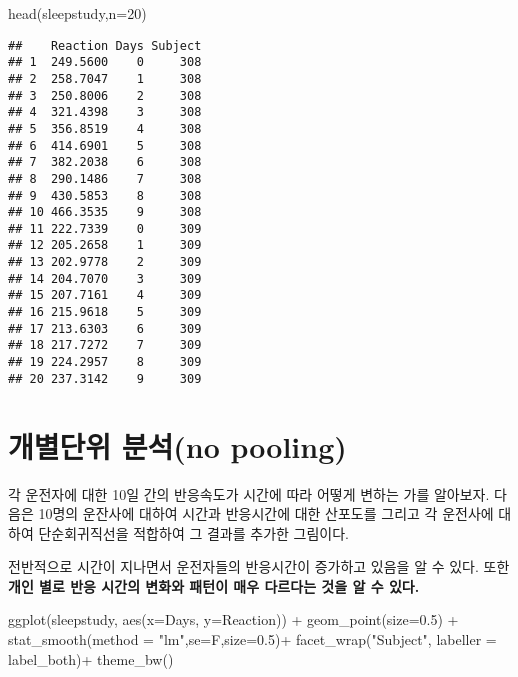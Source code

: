 \documentclass[
]{book}
\newenvironment{Shaded}{\begin{snugshade}}{\end{snugshade}}
\newcommand{\AttributeTok}[1]{\textcolor[rgb]{0.77,0.63,0.00}{#1}}
\newcommand{\DecValTok}[1]{\textcolor[rgb]{0.00,0.00,0.81}{#1}}
\newcommand{\FloatTok}[1]{\textcolor[rgb]{0.00,0.00,0.81}{#1}}
\newcommand{\FunctionTok}[1]{\textcolor[rgb]{0.00,0.00,0.00}{#1}}
\newcommand{\NormalTok}[1]{#1}
\newcommand{\SpecialCharTok}[1]{\textcolor[rgb]{0.00,0.00,0.00}{#1}}
\newcommand{\StringTok}[1]{\textcolor[rgb]{0.31,0.60,0.02}{#1}}
\begin{document}
\begin{Shaded}
\begin{Highlighting}[]
\FunctionTok{head}\NormalTok{(sleepstudy,}\AttributeTok{n=}\DecValTok{20}\NormalTok{)}
\end{Highlighting}
\end{Shaded}

\begin{verbatim}
##    Reaction Days Subject
## 1  249.5600    0     308
## 2  258.7047    1     308
## 3  250.8006    2     308
## 4  321.4398    3     308
## 5  356.8519    4     308
## 6  414.6901    5     308
## 7  382.2038    6     308
## 8  290.1486    7     308
## 9  430.5853    8     308
## 10 466.3535    9     308
## 11 222.7339    0     309
## 12 205.2658    1     309
## 13 202.9778    2     309
## 14 204.7070    3     309
## 15 207.7161    4     309
## 16 215.9618    5     309
## 17 213.6303    6     309
## 18 217.7272    7     309
## 19 224.2957    8     309
## 20 237.3142    9     309
\end{verbatim}

\hypertarget{uxac1cuxbcc4uxb2e8uxc704-uxbd84uxc11dno-pooling}{%
\section{개별단위 분석(no pooling)}\label{uxac1cuxbcc4uxb2e8uxc704-uxbd84uxc11dno-pooling}}

각 운전자에 대한 10일 간의 반응속도가 시간에 따라 어떻게 변하는 가를 알아보자. 다음은 10명의 운잔사에 대하여 시간과 반응시간에 대한 산포도를 그리고 각 운전사에 대하여 단순회귀직선을 적합하여 그 결과를 추가한 그림이다.

전반적으로 시간이 지나면서 운전자들의 반응시간이 증가하고 있음을 알 수 있다. 또한 \textbf{개인 별로 반응 시간의 변화와 패턴이 매우 다르다는 것을 알 수 있다.}

\begin{Shaded}
\begin{Highlighting}[]
\FunctionTok{ggplot}\NormalTok{(sleepstudy, }\FunctionTok{aes}\NormalTok{(}\AttributeTok{x=}\NormalTok{Days, }\AttributeTok{y=}\NormalTok{Reaction)) }\SpecialCharTok{+}
     \FunctionTok{geom\_point}\NormalTok{(}\AttributeTok{size=}\FloatTok{0.5}\NormalTok{) }\SpecialCharTok{+}
     \FunctionTok{stat\_smooth}\NormalTok{(}\AttributeTok{method =} \StringTok{"lm"}\NormalTok{,}\AttributeTok{se=}\NormalTok{F,}\AttributeTok{size=}\FloatTok{0.5}\NormalTok{)}\SpecialCharTok{+}
     \FunctionTok{facet\_wrap}\NormalTok{(}\StringTok{"Subject"}\NormalTok{, }\AttributeTok{labeller =}\NormalTok{ label\_both)}\SpecialCharTok{+} 
     \FunctionTok{theme\_bw}\NormalTok{()}
\end{Highlighting}
\end{Shaded}
\end{document}
